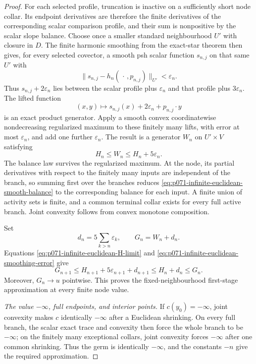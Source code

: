 \begin{proof}
For each selected profile, truncation is inactive on a sufficiently short
node collar.  Its endpoint derivatives are therefore the finite derivatives
of the corresponding scalar comparison profile, and their sum is
nonpositive by the scalar slope balance.  Choose once a smaller standard
neighbourhood $U'$ with closure in $D$.  The finite harmonic smoothing
from the exact-star theorem then gives, for every selected covector, a smooth
psh scalar function $s_{n,j}$ on that same $U'$ with
\[
 \bigl\lVert s_{n,j}-h_n(\,\cdot\,,p_{n,j})\bigr\rVert_{U'}
 <\varepsilon_n.
\]
Thus $s_{n,j}+2\varepsilon_n$ lies between the scalar profile plus
$\varepsilon_n$ and that profile plus $3\varepsilon_n$.  The lifted
function
\[
 (x,y)\longmapsto
 s_{n,j}(x)+2\varepsilon_n+p_{n,j}\mathbin\cdot y
\]
is an exact product generator.  Apply a smooth convex coordinatewise
nondecreasing regularized maximum to these finitely many lifts, with error
at most $\varepsilon_n$, and add one further $\varepsilon_n$.  The
result is a generator $W_n$ on $U'\times V$ satisfying
\begin{equation}
                         H_n\leq W_n\leq H_n+5\varepsilon_n.
 \label{eq:p071-infinite-euclidean-smoothing-error}
\end{equation}
The balance law survives the regularized maximum.  At the node, its partial
derivatives with respect to the finitely many inputs are independent of the
branch, so summing first over the branches reduces
\eqref{eq:p071-infinite-euclidean-smooth-balance} to the corresponding
balance for each input.  A finite union of activity sets is finite, and a
common terminal collar exists for every full active branch.  Joint
convexity follows from convex monotone composition.

Set
\[
 d_n=5\sum_{k>n}\varepsilon_k,
 \qquad G_n=W_n+d_n.
\]
Equations \eqref{eq:p071-infinite-euclidean-H-limit} and
\eqref{eq:p071-infinite-euclidean-smoothing-error} give
\[
 G_{n+1}\leq H_{n+1}+5\varepsilon_{n+1}+d_{n+1}
 \leq H_n+d_n\leq G_n.
\]
Moreover, $G_n\to u$ pointwise.  This proves the fixed-neighbourhood
first-stage approximation at every finite node value.

\medskip\noindent
\emph{The value $-\infty$, full endpoints, and interior points.}
If $c(y_0)=-\infty$, joint convexity makes $c$ identically
$-\infty$ after a Euclidean shrinking.  On every full branch, the scalar
exact trace and convexity then force the whole branch to be
$-\infty$; on the finitely many exceptional collars, joint convexity
forces $-\infty$ after one common shrinking.  Thus the germ is
identically $-\infty$, and the constants $-n$ give the required
approximation.


\end{proof}
